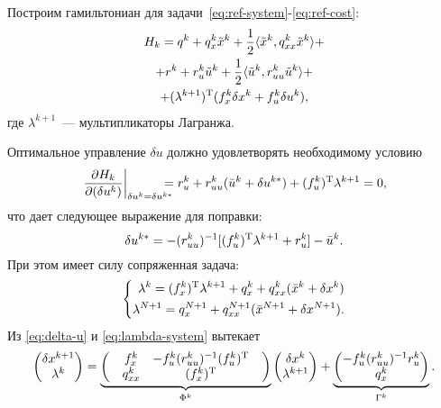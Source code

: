\documentclass[../../doc.tex]{subfiles}
\begin{document}
    Построим гамильтониан для задачи~\eqref{eq:ref-system}-\eqref{eq:ref-cost}:
    \begin{multline}\label{eq:hamiltonian}
        H_k = q^{k} + q_x^{k}\tilde x^{k} + \frac{1}{2}\langle \tilde x^{k}, q_{xx}^{k}\tilde x^{k} \rangle
        +\\+
        r^{k} + r_u^{k}\tilde u^{k} + \frac{1}{2}\langle \tilde u^{k}, r_{uu}^{k}\tilde u^{k} \rangle
        +\\+
        (\lambda^{k+1})^\textnormal{T} (f_x^k \delta x^k + f_u^k \delta u^k),
    \end{multline}
    где $\lambda^{k+1}$~--- мультипликаторы Лагранжа.

    Оптимальное управление $\delta u$ должно удовлетворять необходимому условию
    \begin{equation*}
        \left.\frac{\partial H_k}{\partial (\delta u^k)}\right|_{\delta u^k = \delta u^{k*}}
        \!\!\!\!\!\!=
        r_u^k + r_{uu}^k(\bar u^k + \delta u^{k*}) + (f_u^k)^\textnormal{T}\lambda^{k+1} = 0,
    \end{equation*}
    что дает следующее выражение для поправки:
    \begin{equation}\label{eq:delta-u}
        \delta u^{k*} = - (r_{uu}^k)^{-1}[(f_u^k)^\textnormal{T}\lambda^{k+1} + r_u^k] - \bar u^k.
    \end{equation}
    При этом имеет силу сопряженная задача:
    \begin{equation}\label{eq:lambda-system}
        \left\{\begin{aligned}
            \lambda^k = (f_x^k)^\textnormal{T} \lambda^{k+1} + q_x^k + q_{xx}^k(\bar x^k + \delta x^k)
            \\
            \lambda^{N+1} = q_x^{N+1} + q_{xx}^{N+1}(\bar x^{N+1} + \delta x^{N+1})
            .
        \end{aligned}\right.
    \end{equation}
    Из \eqref{eq:delta-u} и \eqref{eq:lambda-system} вытекает
    \begin{equation}\label{eq:delta-x-lambda-system}
        \begin{pmatrix}
            \delta x^{k+1}
            \\
            \lambda^{k}
        \end{pmatrix}
        =
        \underbrace{\begin{pmatrix}
            & f_x^k & -f^k_u (r^k_{uu})^{-1} (f^k_u)^\textnormal{T} &
            \\
            & q^k_{xx} & (f^k_x)^\textnormal{T} &
        \end{pmatrix}}_{\Phi^k}
        \begin{pmatrix}
            \delta x^k
            \\
            \lambda^{k+1}
        \end{pmatrix}
        +
        \underbrace{\begin{pmatrix}
            -f^k_u (r^k_{uu})^{-1} r^k_u
            \\
            q^k_x
        \end{pmatrix}}_{\Gamma^k}.
    \end{equation}
\end{document}
